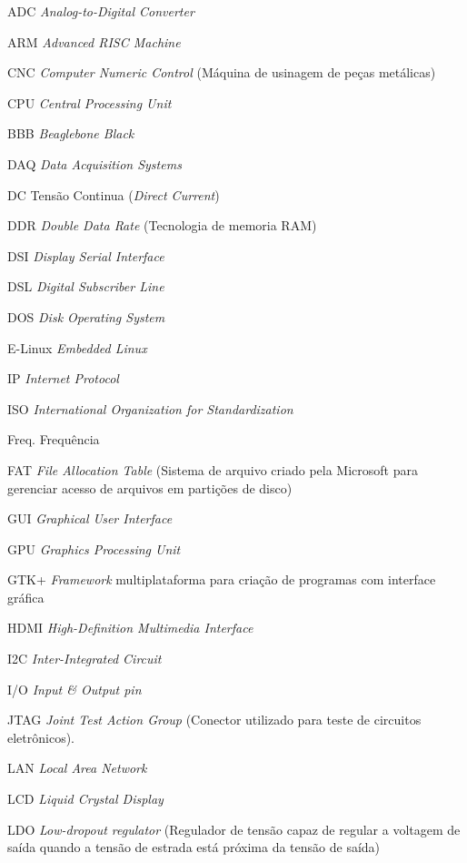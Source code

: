 \begin{siglas}
	\item[ADC] \emph{Analog-to-Digital Converter}
	\item[ARM] \emph{Advanced RISC Machine}
	\item[CNC]  \emph{Computer Numeric Control} (Máquina de usinagem de peças metálicas)
	\item[CPU] \emph{Central Processing Unit}
	\item[BBB] \emph{Beaglebone Black}
	\item[DAQ] \emph{Data Acquisition Systems}
	\item[DC] Tensão Continua (\emph{Direct Current})
	\item[DDR] \emph{Double Data Rate} (Tecnologia de memoria RAM)
	\item[DSI] \emph{Display Serial Interface}
	\item[DSL] \emph{Digital Subscriber Line}
	\item[DOS] \emph{Disk Operating System}
	\item[E-Linux] \emph{Embedded Linux}
	\item[IP] \emph{Internet Protocol}
	\item[ISO] \emph{International Organization for Standardization}
	\item[Freq.] Frequência
	\item[FAT] \emph{File Allocation Table} (Sistema de arquivo criado pela Microsoft para gerenciar acesso de arquivos em partições de disco)
	\item[GUI] \emph{Graphical User Interface}
	\item[GPU] \emph{Graphics Processing Unit}
	\item[GTK+] \emph{Framework} multiplataforma para criação de programas com interface gráfica 
	\item[HDMI] \emph{High-Definition Multimedia Interface}
	\item[I2C] \emph{Inter-Integrated Circuit} 
	\item[I/O] \emph{Input \& Output pin}
	\item[JTAG] \emph{Joint Test Action Group} (Conector utilizado para teste de circuitos eletrônicos).
	\item[LAN] \emph{Local Area Network}
	\item[LCD] \emph{Liquid Crystal Display} 
	\item[LDO] \emph{Low-dropout regulator} (Regulador de tensão capaz de regular a voltagem de saída quando a tensão de estrada está próxima da tensão de saída)

\end{siglas}
